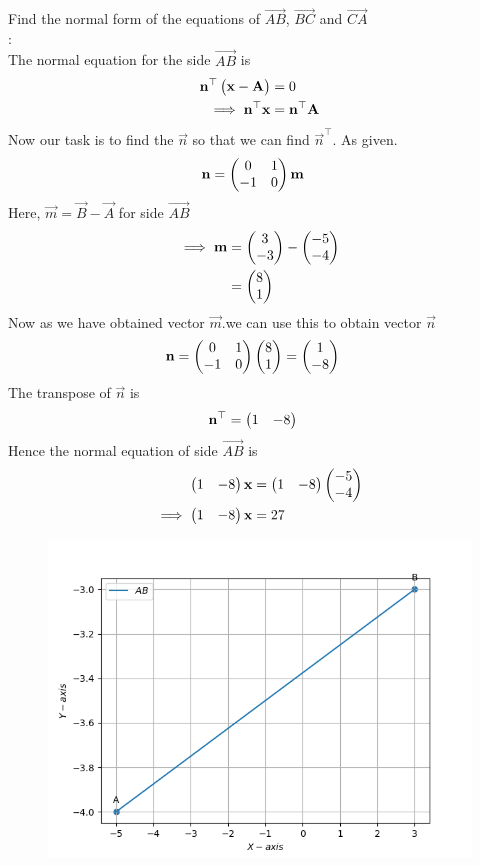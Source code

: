 \documentclass[10pt]{book}
\begin{document}
\begin{enumerate}[label=\thesection.\arabic*.,ref=\thesection.\theenumi]
Find the normal form of the equations of $\vec{AB}$, $\vec{BC}$ and $\vec{CA}$\\
\solution:\\
       The normal equation for the side $\vec{AB}$ is
\begin{align}
\mathbf{n}^{\top}\begin{pmatrix}\mathbf{x}-\mathbf{A}\end{pmatrix}&=0\\
\implies
\mathbf{n}^{\top}\mathbf{x}&=\mathbf{n}^{\top}\mathbf{A}
\end{align}
Now our task is to find the $\vec{n}$ so that we can find $\vec{n}^{\top}$.
As given. 
\begin{align}
  \mathbf{n} &= \begin{pmatrix}0 & 1\\
  -1 & 0\end{pmatrix}\mathbf{m}
\end{align}
Here, $\vec{m} = \vec{B}- \vec{A}$ for side $\vec{AB}$
\begin{align}
\implies
\mathbf{m}&=\begin{pmatrix}3\\-3\end{pmatrix} - \begin{pmatrix}-5\\-4\end{pmatrix}\\
&=\begin{pmatrix}8\\1\end{pmatrix}
\end{align}
Now as we have obtained vector $\vec{m}$.we can use this to obtain vector $\vec{n}$
\begin{align}
\mathbf{n} &= \begin{pmatrix}0 & 1\\
  -1 & 0\end{pmatrix}\begin{pmatrix}8\\1\end{pmatrix}
 = \begin{pmatrix}1\\-8\end{pmatrix}
\end{align}
The transpose of $\vec{n}$ is
\begin{align}
  \mathbf{n}^{\top}&=\begin{pmatrix}1 & -8\end{pmatrix}
\end{align}
Hence the normal equation of side $\vec{AB}$ is 
\begin{align}
    \begin{pmatrix}1 & -8\end{pmatrix}\mathbf{x}&=\begin{pmatrix}1 & -8\end{pmatrix}\begin{pmatrix}-5\\-4\end{pmatrix}\\
    \implies \begin{pmatrix}1 & -8\end{pmatrix}\mathbf{x} &= 27
\end{align}
\begin{figure}[H]
\includegraphics [width=\columnwidth]{figs/AB_line.png}

\end{figure}
\end{enumerate}
\end{document}
